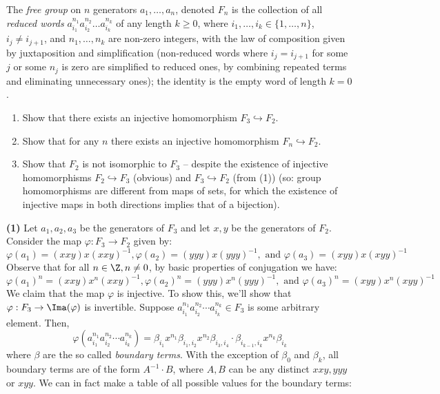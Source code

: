 \documentclass[11pt,letterpaper]{article}
\begin{document}
\pagebreak
\begin{problem}
  The {\em free group} on $n$ generators $a_1,\dots,a_n$, denoted $F_n$ is the collection of all {\em reduced words} $a_{i_1}^{n_1} a_{i_2}^{n_2} \dots a_{i_k}^{n_k}$ of any length $k\geq 0$, where $i_1,\dots,i_k\in \{1,\dots,n\}$, $i_j\neq i_{j+1}$, and $n_1,\dots,n_k$ are non-zero integers, with the law of composition given by juxtaposition and simplification (non-reduced words where $i_j=i_{j+1}$ for some $j$ or some $n_j$ is zero are simplified to reduced ones, by combining repeated terms and eliminating unnecessary ones); the identity is the empty word of length $k=0$.

  \begin{enumerate}
    \item Show that there exists an injective homomorphism $F_3\hookrightarrow F_2$.
    \item Show that for any $n$ there exists an injective
    homomorphism $F_n\hookrightarrow F_2$.
    \item Show that $F_2$ is not isomorphic to $F_3$ -- despite the existence of injective homomorphisms $F_2\hookrightarrow F_3$ (obvious) and $F_3\hookrightarrow F_2$ (from (1)) (so: group homomorphisms are different from maps of sets, for which the existence of injective maps in both directions implies that of a bijection).
  \end{enumerate}
\end{problem}

\textbf{(1)} Let $a_1,a_2,a_3$ be the generators of $F_3$ and let $x, y$ be the generators of $F_2$. Consider the map $\varphi : F_3 \to F_2$ given by:
\[\varphi(a_1) = (xxy)x(xxy)^{-1}, \varphi(a_2) = (yyy)x(yyy)^{-1}, \textrm{ and } \varphi(a_3) = (xyy)x(xyy)^{-1}\]
Observe that for all $n\in \Z, n\neq 0$, by basic properties of conjugation we have:
\[\varphi(a_1)^n = (xxy)x^n(xxy)^{-1}, \varphi(a_2)^n = (yyy)x^n(yyy)^{-1}, \textrm{ and } \varphi(a_3)^n = (xyy)x^n(xyy)^{-1}\]
We claim that the map $\varphi$ is injective. To show this, we'll show that $\varphi : F_3 \to \Ima(\varphi)$ is invertible. Suppose $a_{i_1}^{n_1}a_{i_2}^{n_2}\cdots a_{i_k}^{n_k}\in F_3$ is some arbitrary element. Then, 
\[\varphi(a_{i_1}^{n_1}a_{i_2}^{n_2}\cdots a_{i_k}^{n_k}) = \beta_{i_1} x^{n_1}\beta_{i_1,i_2} x^{n_2}\beta_{i_3,i_4} \cdot \beta_{i_{k-1}, i_k}x^{n_k}\beta_{i_{k}}\]
where $\beta$ are the so called {\em boundary terms}. With the exception of $\beta_0$ and $\beta_k$, all boundary terms are of the form $A^{-1}\cdot B$, where $A, B$ can be any distinct $xxy, yyy$ or $xyy$. We can in fact make a table of all possible values for the boundary terms: 
\end{document}
